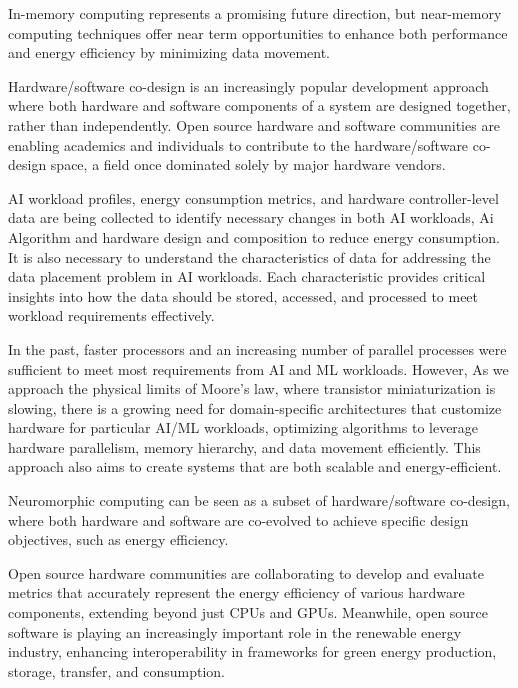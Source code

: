In-memory computing represents a promising future direction, but near-memory computing techniques offer near term opportunities to enhance both performance and energy efficiency by minimizing data movement.

Hardware/software co-design is an increasingly popular development approach where both hardware and software components of a system are designed together, rather than independently. Open source hardware and software communities are enabling academics and individuals to contribute to the hardware/software co-design space, a field once dominated solely by major hardware vendors.

AI workload profiles, energy consumption metrics, and hardware controller-level data are being collected to identify necessary changes in both AI workloads, Ai Algorithm and hardware design and composition to reduce energy consumption.    It is also necessary to understand the characteristics of data for addressing the data placement problem in AI workloads. Each characteristic provides critical insights into how the data should be stored, accessed, and processed to meet workload requirements effectively. 

In the past, faster processors and an increasing number of parallel processes were sufficient to meet most requirements from AI and ML workloads. However, As we approach the physical limits of Moore’s law, where transistor miniaturization is slowing, there is a growing need for domain-specific architectures that customize hardware for particular AI/ML workloads, optimizing algorithms to leverage hardware parallelism, memory hierarchy, and data movement efficiently. This approach also aims to create systems that are both scalable and energy-efficient.

Neuromorphic computing can be seen as a subset of hardware/software co-design, where both hardware and software are co-evolved to achieve specific design objectives, such as energy efficiency.

Open source hardware communities are collaborating to develop and evaluate metrics that accurately represent the energy efficiency of various hardware components, extending beyond just CPUs and GPUs. Meanwhile, open source software is playing an increasingly important role in the renewable energy industry, enhancing interoperability in frameworks for green energy production, storage, transfer, and consumption.





